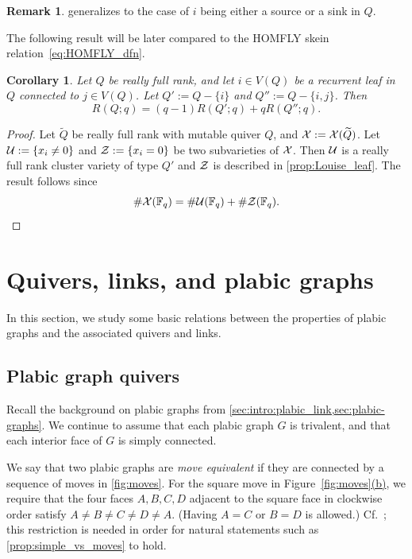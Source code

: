 \documentclass[11pt]{article}
\newtheorem{corollary}[theo]{Corollary}
\theoremstyle{definition}
\newtheorem{remark}[theo]{Remark}
\numberwithin{equation}{section}
\newcommand\Qice{\widetilde{Q}}
\def\RQ(#1){R(Q;#1)}
\def\RQX#1#2{R(#1;#2)}
\newcommand\F{\mathbb{F}}
\newcommand\XQice{\Xcal(\Qice)}
\def\figref#1(#2){Figure~\hyperref[#1]{\ref*{#1}(#2)}}
\newcommand\Louiseleaf{recurrent leaf\xspace}
\newcommand{\FLY}{HOMFLY\xspace}
\begin{document}
\begin{remark}
 generalizes to the case of $i$ being either a source or a sink in $Q$.
\end{remark}
The following result will be later compared to the \FLY skein relation~\eqref{eq:HOMFLY_dfn}.
\begin{corollary}\label{cor:RQ_skein}
  Let $Q$ be really full rank, and let $i\in V(Q)$ be a \Louiseleaf in $Q$ connected to $j\in V(Q)$. Let $Q':=Q-\{i\}$ and $Q'':=Q-\{i,j\}$. Then
  \begin{equation}\label{eq:RQ_skein}
    \RQ(q)=(q-1)\RQX{Q'}{q} + q\RQX{Q''}{q}.
  \end{equation}
\end{corollary}
\begin{proof}
  Let $\Qice$ be really full rank with mutable quiver $Q$, and $\Xcal:=\XQice$. Let $\mathcal{U}:=\{x_i\neq0\}$ and $\mathcal{Z}:=\{x_i=0\}$ be two subvarieties of $\mathcal{X}$. Then $\mathcal{U}$ is a really full rank cluster variety of type $Q'$ and $\mathcal{Z}$ is described in \cref{prop:Louise_leaf}. The result follows since
  \begin{equation*}%
    \#\Xcal(\F_q)=\#\Ucal(\F_q) + \#\Zcal(\F_q).    \qedhere
  \end{equation*}
\end{proof}

\section{Quivers, links, and plabic graphs}
In this section, we study some basic relations between the properties of plabic graphs and the associated quivers and links.

\subsection{Plabic graph quivers}\label{sec:plabquiver}
Recall the background on plabic graphs from \cref{sec:intro:plabic_link,sec:plabic-graphs}. We continue to assume that each plabic graph $G$ is trivalent, and that each interior face of $G$ is simply connected.
%
%
%
%
%
%
%
%
%
%
%
%

We say that two plabic graphs are \emph{move equivalent} if they are connected by a sequence of moves in \cref{fig:moves}. For the square move in \figref{fig:moves}(b), we require that the four faces $A,B,C,D$ adjacent to the square face in clockwise order satisfy $A\neq B\neq C\neq D\neq A$. (Having $A=C$ or $B=D$ is allowed.) Cf.~\cite[Restriction~6.3]{FPST}; this restriction is needed in order for natural statements such as \cref{prop:simple_vs_moves} to hold.
\end{document}

